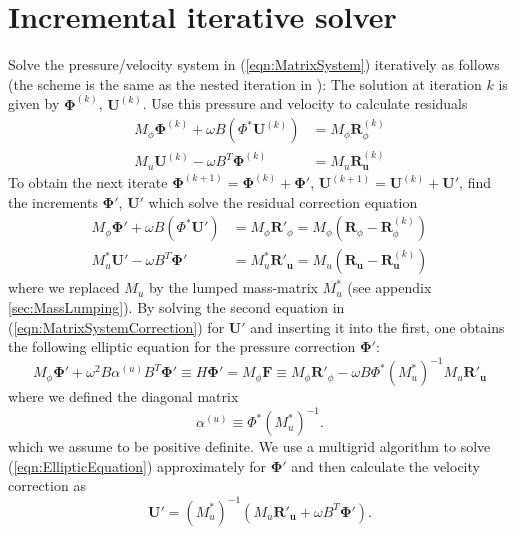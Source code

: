 \documentclass[12pt]{article}
\renewcommand{\vec}[1]{\boldsymbol{#1}}
\begin{document}
\section{Incremental iterative solver}
Solve the pressure/velocity system in (\ref{eqn:MatrixSystem}) iteratively as follows (the scheme is the same as the nested iteration in \cite{Wilson2010}):
The solution at iteration $k$ is given by $\vec{\Phi}^{(k)}$, $\vec{U}^{(k)}$.
 Use this pressure and velocity to calculate residuals
\begin{equation}
 \begin{aligned}
  M_{\phi} \vec{\Phi}^{(k)} + \omega B (\Phi^* \vec{U}^{(k)}) &= M_{\phi}\vec{R}^{(k)}_\phi \\
  M_{u} \vec{U}^{(k)} - \omega B^T \vec{\Phi}^{(k)} &= M_u \vec{R}^{(k)}_{\vec{u}}
 \end{aligned}
\end{equation}
To obtain the next iterate $\vec{\Phi}^{(k+1)} = \vec{\Phi}^{(k)}+\vec{\Phi}'$, $\vec{U}^{(k+1)} = \vec{U}^{(k)}+\vec{U}'$, find the increments $\vec{\Phi}'$, $\vec{U}'$ which solve the residual correction equation
\begin{equation}
 \begin{aligned}
  M_{\phi} \vec{\Phi}' + \omega B (\Phi^* \vec{U}') &= M_{\phi}\vec{R}'_\phi
= M_\phi\left(\vec{R}_\phi-\vec{R}^{(k)}_\phi\right)\\
  M^*_{u} \vec{U}' - \omega B^T \vec{\Phi}' &= M^*_u \vec{R}'_{\vec{u}}
= {M_u} \left(\vec{R}_{\vec{u}}-\vec{R}^{(k)}_{\vec{u}}\right)
 \end{aligned}
\label{eqn:MatrixSystemCorrection}
\end{equation}
where we replaced $M_u$ by the lumped mass-matrix $M_u^*$ (see appendix \ref{sec:MassLumping}). By solving the second equation in (\ref{eqn:MatrixSystemCorrection}) for $\vec{U}'$ and inserting it into the first, one obtains the following elliptic equation for the pressure correction $\vec{\Phi}'$:
\begin{equation}
  M_{\phi}\vec{\Phi}' + \omega^2 B \alpha^{(u)} B^T \vec{\Phi}'
  \equiv H\vec{\Phi}' = M_{\phi}\vec{F} \equiv M_{\phi}\vec{R}'_{\phi}-\omega B \Phi^* \left(M_u^*\right)^{-1}M_u\vec{R}'_{\vec{u}}
\label{eqn:EllipticEquation}
\end{equation}
where we defined the diagonal matrix
\begin{equation}
  \alpha^{(u)} \equiv \Phi^* \left(M_u^*\right)^{-1}.
\end{equation}
which we assume to be positive definite. We use a multigrid algorithm to solve 
(\ref{eqn:EllipticEquation}) approximately for $\vec{\Phi}'$ and then calculate the velocity correction as 
\begin{equation}
  \vec{U}' = \left(M_u^*\right)^{-1}\left(M_u\vec{R}'_{\vec{u}}+ \omega B^T \vec{\Phi}'\right).
\end{equation}
\end{document}
